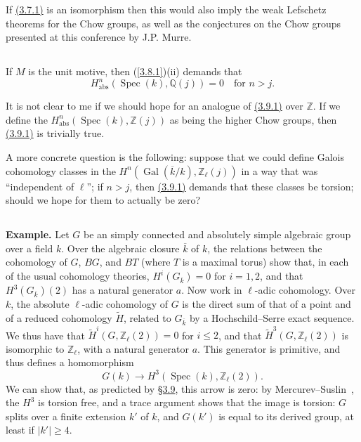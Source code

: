 \documentclass{article}
\theoremstyle{plain}
\theoremstyle{definition}
\newcommand{\ZZ}{\mathbb{Z}}
\newcommand{\QQ}{\mathbb{Q}}
\newcommand{\abs}{\mathrm{abs}}
\renewcommand{\geq}{\geqslant}
\renewcommand{\leq}{\leqslant}
\DeclareMathOperator{\Spec}{Spec}
\DeclareMathOperator{\Gal}{Gal}
\newcommand{\oldpage}[1]{\marginpar{\footnotesize$\Big\vert$ \textit{p.~#1}}}
\begin{document}
If \hyperref[3.7.1]{(3.7.1)} is an isomorphism then this would also imply the weak Lefschetz theorems for the Chow groups, as well as the conjectures on the Chow groups presented at this conference by J.P. Murre.


\oldpage{159}
\subsection{}
\label{3.9}

If $M$ is the unit motive, then (\ref{3.8.1})(ii) demands that
\[
\label{3.9.1}
  H_\abs^n(\Spec(k),\QQ(j)) = 0 \quad\mbox{for $n>j$}.
\tag{3.9.1}
\]

It is not clear to me if we should hope for an analogue of \hyperref[3.9.1]{(3.9.1)} over $\ZZ$.
If we define the $H_\abs^n(\Spec(k),\ZZ(j))$ as being the higher Chow groups, then \hyperref[3.9.1]{(3.9.1)} is trivially true.

A more concrete question is the following: suppose that we could define Galois cohomology classes in the $H^n(\Gal(\overline{k}/k),\ZZ_\ell(j))$ in a way that was ``independent of $\ell$''; if $n>j$, then \hyperref[3.9.1]{(3.9.1)} demands that these classes be torsion; should we hope for them to actually be zero?


\subsection{}
\label{3.10}

\textbf{Example.}
Let $G$ be an simply connected and absolutely simple algebraic group over a field $k$.
Over the algebraic closure $\overline{k}$ of $k$, the relations between the cohomology of $G$, $BG$, and $BT$ (where $T$ is a maximal torus) show that, in each of the usual cohomology theories, $H^i(G_{\overline{k}})=0$ for $i=1,2$, and that $H^3(G_{\overline{k}})(2)$ has a natural generator $a$.
Now work in $\ell$-adic cohomology.
Over $k$, the absolute $\ell$-adic cohomology of $G$ is the direct sum of that of a point and of a reduced cohomology $\widetilde{H}$, related to $G_{\overline{k}}$ by a Hochschild--Serre exact sequence.
We thus have that $\widetilde{H}^i(G,\ZZ_\ell(2))=0$ for $i\leq2$, and that $\widetilde{H}^3(G,\ZZ_\ell(2))$ is isomorphic to $\ZZ_\ell$, with a natural generator $a$.
This generator is primitive, and thus defines a homomorphism
\[
  G(k) \to H^3(\Spec(k),\ZZ_\ell(2)).
\]
We can show that, as predicted by \hyperref[3.9]{\S3.9}, this arrow is zero:
by Mercurev--Suslin~\cite{27}, the $H^3$ is torsion free, and a trace argument shows that the image is torsion:
$G$ splits over a finite extension $k'$ of $k$, and $G(k')$ is equal to its derived group, at least if $|k'|\geq4$.
\end{document}
